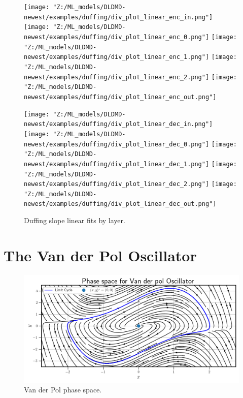 \begin{figure}[p]
    \centering
    \begin{minipage}{.5\textwidth}
        \texttt{[image: "Z:/ML\_models/DLDMD-newest/examples/duffing/div\_plot\_linear\_enc\_in.png"]} 
        \texttt{[image: "Z:/ML\_models/DLDMD-newest/examples/duffing/div\_plot\_linear\_enc\_0.png"]} 
        \texttt{[image: "Z:/ML\_models/DLDMD-newest/examples/duffing/div\_plot\_linear\_enc\_1.png"]} 
        \texttt{[image: "Z:/ML\_models/DLDMD-newest/examples/duffing/div\_plot\_linear\_enc\_2.png"]} 
        \texttt{[image: "Z:/ML\_models/DLDMD-newest/examples/duffing/div\_plot\_linear\_enc\_out.png"]} 
    \end{minipage}%
    \begin{minipage}{.5\textwidth}
        \texttt{[image: "Z:/ML\_models/DLDMD-newest/examples/duffing/div\_plot\_linear\_dec\_in.png"]} 
        \texttt{[image: "Z:/ML\_models/DLDMD-newest/examples/duffing/div\_plot\_linear\_dec\_0.png"]} 
        \texttt{[image: "Z:/ML\_models/DLDMD-newest/examples/duffing/div\_plot\_linear\_dec\_1.png"]} 
        \texttt{[image: "Z:/ML\_models/DLDMD-newest/examples/duffing/div\_plot\_linear\_dec\_2.png"]} 
        \texttt{[image: "Z:/ML\_models/DLDMD-newest/examples/duffing/div\_plot\_linear\_dec\_out.png"]} 
    \end{minipage}
    \caption{Duffing slope linear fits by layer.}
    \label{fig:duffing linear fits all layers}
\end{figure}

\section{The Van der Pol Oscillator}
\label{section:van der pol results}

\begin{figure}[ht]
    \centering
    \begin{minipage}{\textwidth}
        \includegraphics[width=\textwidth]{"Figures/van_der_pol_phase_space.png"} 
    \end{minipage}
    \caption{Van der Pol phase space.}
    \label{fig:van der pol phase space}
\end{figure}

